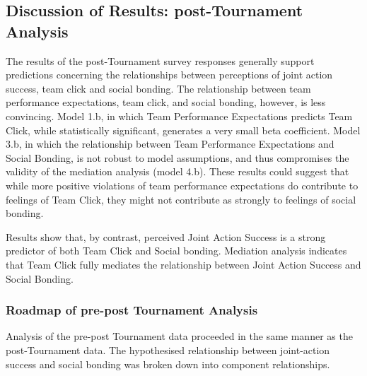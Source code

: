 {%


\subsection{Discussion of Results: post-Tournament Analysis}
The results of the post-Tournament survey responses generally support predictions concerning the relationships between perceptions of joint action success, team click and social bonding.  The relationship between team performance expectations, team click, and social bonding, however, is less convincing.  Model 1.b, in which Team Performance Expectations predicts Team Click, while statistically significant, generates a very small beta coefficient.  Model 3.b, in which the relationship between Team Performance Expectations and Social Bonding, is not robust to model assumptions, and thus compromises the validity of the mediation analysis (model 4.b).  These results could suggest that while more positive violations of team performance expectations do contribute to feelings of Team Click, they might not contribute as strongly to feelings of social bonding.

Results show that, by contrast, perceived Joint Action Success is a strong predictor of both Team Click and Social bonding. Mediation analysis indicates that Team Click fully mediates the relationship between Joint Action Success and Social Bonding.












\subsubsection{Roadmap of pre-post Tournament Analysis}
Analysis of the pre-post Tournament data proceeded in the same manner as the post-Tournament data. The hypothesised relationship between joint-action success and social bonding was broken down into component relationships. \\

}
